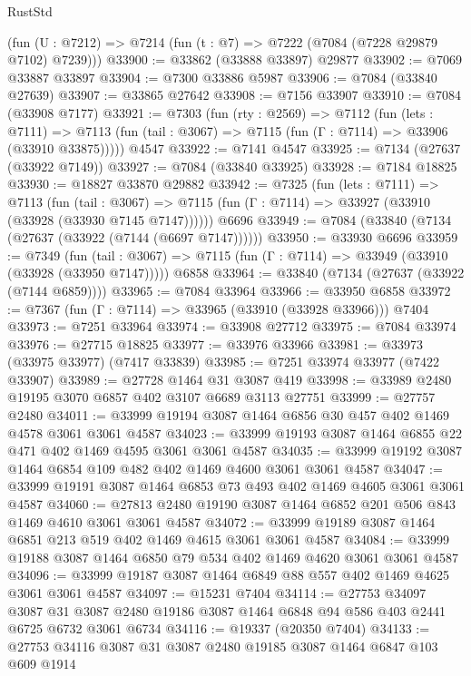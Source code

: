 \begin{lexlean}{RustStd}
\begin{coremodule}
    (fun (U : @7212) => @7214 (fun (t : @7) => @7222 (@7084 (@7228 @29879 @7102) @7239)))
@33900 := @33862 (@33888 @33897) @29877
@33902 := @7069 @33887 @33897
@33904 := @7300 @33886 @5987
@33906 := @7084 (@33840 @27639)
@33907 := @33865 @27642
@33908 := @7156 @33907
@33910 := @7084 (@33908 @7177)
@33921 := @7303
    (fun (rty : @2569) =>
    @7112
      (fun (lets : @7111) =>
      @7113 (fun (tail : @3067) => @7115 (fun (Γ : @7114) => @33906 (@33910 @33875)))))
    @4547
@33922 := @7141 @4547
@33925 := @7134 (@27637 (@33922 @7149))
@33927 := @7084 (@33840 @33925)
@33928 := @7184 @18825
@33930 := @18827 @33870 @29882
@33942 := @7325
    (fun (lets : @7111) =>
    @7113
      (fun (tail : @3067) =>
      @7115 (fun (Γ : @7114) => @33927 (@33910 (@33928 (@33930 @7145 @7147))))))
    @6696
@33949 := @7084 (@33840 (@7134 (@27637 (@33922 (@7144 (@6697 @7147))))))
@33950 := @33930 @6696
@33959 := @7349
    (fun (tail : @3067) => @7115 (fun (Γ : @7114) => @33949 (@33910 (@33928 (@33950 @7147)))))
    @6858
@33964 := @33840 (@7134 (@27637 (@33922 (@7144 @6859))))
@33965 := @7084 @33964
@33966 := @33950 @6858
@33972 := @7367 (fun (Γ : @7114) => @33965 (@33910 (@33928 @33966))) @7404
@33973 := @7251 @33964
@33974 := @33908 @27712
@33975 := @7084 @33974
@33976 := @27715 @18825
@33977 := @33976 @33966
@33981 := @33973 (@33975 @33977) (@7417 @33839)
@33985 := @7251 @33974 @33977 (@7422 @33907)
@33989 := @27728 @1464 @31 @3087 @419
@33998 := @33989 @2480 @19195 @3070 @6857 @402 @3107 @6689 @3113 @27751
@33999 := @27757 @2480
@34011 := @33999 @19194 @3087 @1464 @6856 @30 @457 @402 @1469 @4578 @3061 @3061 @4587
@34023 := @33999 @19193 @3087 @1464 @6855 @22 @471 @402 @1469 @4595 @3061 @3061 @4587
@34035 := @33999 @19192 @3087 @1464 @6854 @109 @482 @402 @1469 @4600 @3061 @3061 @4587
@34047 := @33999 @19191 @3087 @1464 @6853 @73 @493 @402 @1469 @4605 @3061 @3061 @4587
@34060 := @27813 @2480 @19190 @3087 @1464 @6852 @201 @506 @843 @1469 @4610 @3061 @3061 @4587
@34072 := @33999 @19189 @3087 @1464 @6851 @213 @519 @402 @1469 @4615 @3061 @3061 @4587
@34084 := @33999 @19188 @3087 @1464 @6850 @79 @534 @402 @1469 @4620 @3061 @3061 @4587
@34096 := @33999 @19187 @3087 @1464 @6849 @88 @557 @402 @1469 @4625 @3061 @3061 @4587
@34097 := @15231 @7404
@34114 := @27753
    @34097
    @3087
    @31
    @3087
    @2480
    @19186
    @3087
    @1464
    @6848
    @94
    @586
    @403
    @2441
    @6725
    @6732
    @3061
    @6734
@34116 := @19337 (@20350 @7404)
@34133 := @27753
    @34116
    @3087
    @31
    @3087
    @2480
    @19185
    @3087
    @1464
    @6847
    @103
    @609
    @1914

\end{coremodule}
\end{lexlean}
